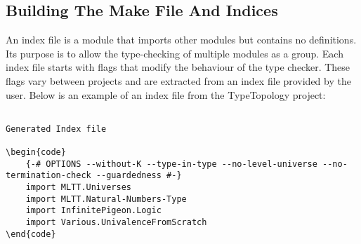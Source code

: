 
\subsection{Building The Make File And Indices} \label{sub:build_make_index}

An index file is a module that imports other modules but contains no
definitions. Its purpose is to allow the type-checking of multiple modules as a
group. Each index file starts with flags that modify the behaviour of the type
checker. These flags vary between projects and are extracted from an index file
provided by the user. Below is an example of an index file from the
TypeTopology project:

\noindent
\begin{minipage}{\textwidth}
\begin{lstlisting}
    
Generated Index file

\begin{code}
    {-# OPTIONS --without-K --type-in-type --no-level-universe --no-termination-check --guardedness #-}
    import MLTT.Universes
    import MLTT.Natural-Numbers-Type
    import InfinitePigeon.Logic
    import Various.UnivalenceFromScratch
\end{code}
\end{lstlisting}
\end{minipage}

